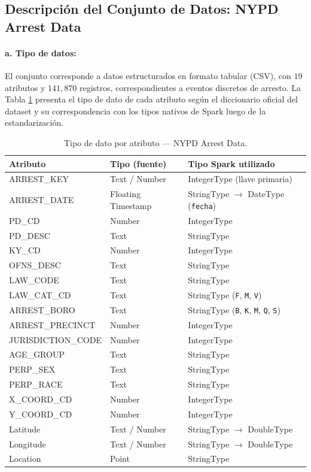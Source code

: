 \subsection{Descripción del Conjunto de Datos: NYPD Arrest Data}
\label{subsec:desc_arrest_data}

\paragraph{a. Tipo de datos:} El conjunto corresponde a datos estructurados en formato tabular (CSV), con $19$ atributos y $141,870$ registros, correspondientes a eventos discretos de arresto. La Tabla \ref{tab:tipos_arrest_data} presenta el tipo de dato de cada atributo según el diccionario oficial del dataset y su correspondencia con los tipos nativos de Spark luego de la estandarización.

\begin{table}[H]
\centering
\small
\caption{Tipo de dato por atributo --- NYPD Arrest Data.}
\label{tab:tipos_arrest_data}
\begin{tabular}{l l l}
\toprule
\textbf{Atributo} & \textbf{Tipo (fuente)} & \textbf{Tipo Spark utilizado} \\
\midrule
ARREST\_KEY & Text / Number & IntegerType (llave primaria) \\
ARREST\_DATE & Floating Timestamp & StringType $\rightarrow$ DateType (\texttt{fecha}) \\
PD\_CD & Number & IntegerType \\
PD\_DESC & Text & StringType \\
KY\_CD & Number & IntegerType \\
OFNS\_DESC & Text & StringType \\
LAW\_CODE & Text & StringType \\
LAW\_CAT\_CD & Text & StringType (\texttt{F}, \texttt{M}, \texttt{V}) \\
ARREST\_BORO & Text & StringType (\texttt{B}, \texttt{K}, \texttt{M}, \texttt{Q}, \texttt{S}) \\
ARREST\_PRECINCT & Number & IntegerType \\
JURISDICTION\_CODE & Number & IntegerType \\
AGE\_GROUP & Text & StringType \\
PERP\_SEX & Text & StringType \\
PERP\_RACE & Text & StringType \\
X\_COORD\_CD & Number & IntegerType \\
Y\_COORD\_CD & Number & IntegerType \\
Latitude & Text / Number & StringType $\rightarrow$ DoubleType \\
Longitude & Text / Number & StringType $\rightarrow$ DoubleType \\
Location & Point & StringType \\
\bottomrule
\end{tabular}
\end{table}

